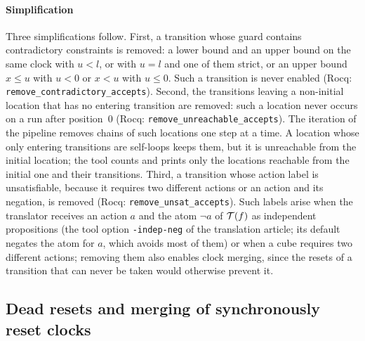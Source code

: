\paragraph{Simplification}
Three simplifications follow.  First, a transition whose guard contains
contradictory constraints is removed: a lower bound and an upper bound on the
same clock with $u<l$, or with $u=l$ and one of them strict, or an upper bound
$x\le u$ with $u<0$ or $x<u$ with $u\le0$.  Such a transition is never enabled (Rocq:
\texttt{remove\_\allowbreak{}contradictory\_\allowbreak{}accepts}).  Second, the transitions
leaving a non-initial location that has no entering transition
are removed: such a location never occurs on a run after position~$0$ (Rocq:
\texttt{remove\_\allowbreak{}unreachable\_\allowbreak{}accepts}).  The iteration of the pipeline
removes chains of such locations one step at a time.  A location whose only
entering transitions are self-loops keeps them, but it is unreachable from
the initial location; the tool counts and prints only the locations
reachable from the initial one and their transitions.  Third, a transition whose
action label is unsatisfiable, because it requires two different actions or an
action and its negation, is removed (Rocq:
\texttt{remove\_\allowbreak{}unsat\_\allowbreak{}accepts}).  Such labels arise when the
translator receives an action $a$ and the atom $\neg a$ of $\mathcal{T}(f)$ as independent
propositions (the tool option \texttt{-indep-neg} of the translation article;
its default negates the atom for $a$, which avoids most of them) or when a cube
requires two different actions; removing them also enables clock merging, since the resets of a
transition that can never be taken would otherwise prevent it.

\subsection{Dead resets and merging of synchronously reset clocks}
\label{sec:dead-merge}\label{sec:main-dead-merge}
